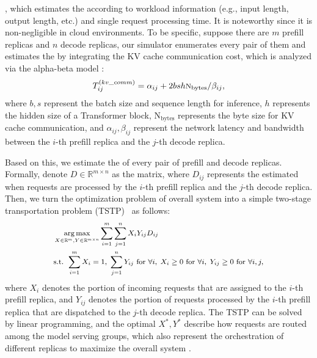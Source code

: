 , which estimates the  according to workload information (e.g., input length, output length, etc.) and single request processing time. It is noteworthy  since it is non-negligible in cloud environments. To be specific, suppose there are $m$ prefill replicas and $n$ decode replicas, our simulator enumerates every pair of them and estimates the  by integrating the KV cache communication cost, which is analyzed via the alpha-beta model \cite{hockney1994communication}:
\begin{equation}
\semismall
\label{eq:kv_comm_cost}
  {T}^{(kv\_comm)}_{ij} = {\alpha_{ij}} + {2bsh\text{N}_{\text{bytes}}}/{\beta_{ij}},
\end{equation}
where \( b, s \) represent the batch size and sequence length for inference, \( h \) represents the hidden size of a Transformer block, \(\text{N}_{\text{bytes}} \) represents the byte size for KV cache communication, and \( \alpha_{ij}, \beta_{ij} \) represent the network latency and bandwidth between the $i$-th prefill replica and the $j$-th decode replica. 

Based on this, we estimate the  of every pair of prefill and decode replicas. Formally, denote $D \in \mathbb{R}^{m \times n}$ as the  matrix, where $D_{ij}$ represents the estimated  when requests are processed by the $i$-th prefill replica and the $j$-th decode replica. Then, we turn the optimization problem of overall system  into a simple two-stage transportation problem (TSTP)~\cite{santoso2022development}
as follows:
\begin{equation*}
\semismall
\begin{aligned}
& \argmax_{X \in \mathbb{R}^{m}, Y \in \mathbb{R}^{m \times n}} 
\sum_{i=1}^{m} \sum_{j=1}^{n} X_i Y_{ij} D_{ij} \\
& \text{s.t. } 
\sum_{i=1}^{m} X_i = 1, \;
\sum_{j=1}^{n} Y_{ij} \text{ for }\forall i, \;
X_i \geq 0 \text{ for }\forall i, \;
Y_{ij} \geq 0 \text{ for }\forall i, j,
\end{aligned}
\end{equation*}
where $X_i$ denotes the portion of incoming requests that are assigned to the $i$-th prefill replica, and $Y_{ij}$ denotes the portion of requests processed by the $i$-th prefill replica that are dispatched to the $j$-th decode replica. The TSTP can be solved by linear programming, and the optimal $X^*, Y^*$ describe how requests are routed among the model serving groups, which also represent the orchestration of different replicas to maximize the overall system .

